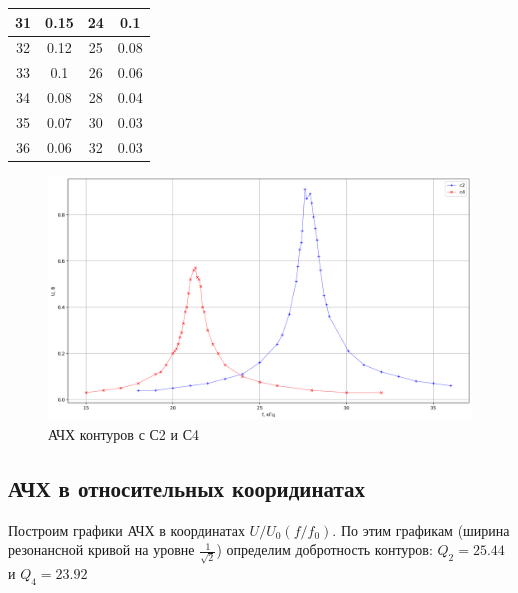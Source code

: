 \documentclass[a4paper]{article}
\begin{document}
\begin{table}[H]
\begin{tabular}{|c|c|c|c|}
        31                          & 0.15                       & 24       & 0.1    \\ \hline
        32                          & 0.12                       & 25       & 0.08   \\ \hline
        33                          & 0.1                        & 26       & 0.06   \\ \hline
        34                          & 0.08                       & 28       & 0.04   \\ \hline
        35                          & 0.07                       & 30       & 0.03   \\ \hline
        36                          & 0.06                       & 32       & 0.03   \\ \hline

    \end{tabular}
\end{table}

\begin{figure}[H]
    \centering
    \includegraphics[width=\textwidth]{lol.png}
    \caption{АЧХ контуров с С2 и С4}
    \label{fig:vac}
\end{figure}


\subsection{АЧХ в относительных кооридинатах}

Построим графики АЧХ в координатах $U/U_0(f/f_0)$. По этим графикам (ширина резонансной кривой на уровне $\frac{1}{\sqrt{2}}$) определим добротность контуров: $Q_2 = 25.44$ и $Q_4 = 23.92$
\end{document}
